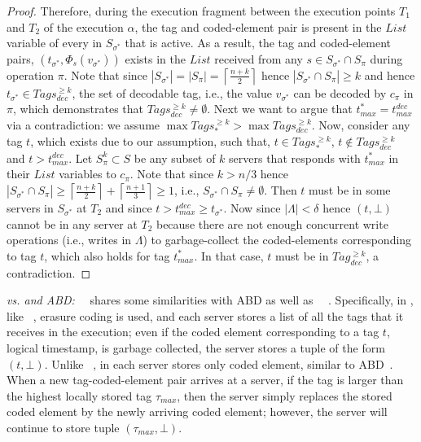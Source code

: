 \begin{proof}
				 Therefore, during the execution fragment between the execution points $T_1$ and $T_2$ of the execution $\alpha$, the tag and coded-element pair is present in the $List$ variable of every in $S_{\sigma^*}$ that is active. As a result, the tag and coded-element pairs, $(t_{\sigma^*}, \Phi_s(v_{\sigma^*}))$ exists in the $List$ received from any
				  $s \in S_{\sigma^*} \cap S_{\pi}$ during operation $\pi$. Note that since $|S_{\sigma^*}| = |S_{\pi}| =\left\lceil \frac{n+k}{2} \right \rceil $ hence
				 $| S_{\sigma^*} \cap S_{\pi} | \geq k$ and hence 
				 $t_{\sigma^*} \in Tags_{dec}^{\geq k} $, the set of decodable tag, i.e., the value $v_{\sigma^*}$ can be decoded
				  by $c_{\pi}$ in $\pi$, which demonstrates that $Tags_{dec}^{\geq k}  \neq \emptyset$. Next we want to 
				  argue that 
				  $t_{max}^* = t_{max}^{dec}$ via a contradiction: we assume 
				  $ \max Tags_{*}^{\geq k}  >  \max Tags_{dec}^{\geq k}  $. Now, consider any tag $t$, which  exists due to our assumption,  such that, 
				  $t \in Tags_{*}^{\geq k} $,  $t \not\in Tags_{dec}^{\geq k} $ and $t > t_{max}^{dec}$.
				 Let $S^k_{\pi} \subset S$ be any subset of $k$ servers that responds with $t^*_{max}$ in their $List$ variables to $c_{\pi}$. Note that since $k >  n/3$ hence $|S_{\sigma^*} \cap S_{\pi}|  \geq \left\lceil \frac{n+k}{2} \right \rceil +  \left\lceil \frac{n+1}{3} \right \rceil \geq 1$, i.e., $S_{\sigma^*} \cap S_{\pi} \neq \emptyset$. Then $t$ 
				 must be in some servers in $S_{\sigma^*}$ at $T_2$ and since $t > t_{max}^{dec} \geq t_{\sigma^*}$. 
				 Now since $|\Lambda| < \delta$ hence $(t, \bot)$ cannot be in any server at $T_2$  because there are not enough concurrent write operations (i.e., writes in $\Lambda$) to garbage-collect the coded-elements corresponding to tag $t$, which also holds  for tag  $t^{*}_{max}$. In that case, $t$ must be in $Tag_{dec}^{\geq k}$, a contradiction.
%
				\end{proof}
				
\noindent\textit{\treasmod{} vs. \treas{} and ABD:}~~\treasmod{}  shares some similarities with ABD \cite{ABD96} as well as ~\treas~\cite{NicolaouC0KML19}. Specifically, in \treasmod{}, like ~\treas{}, erasure coding is used, and each server stores a list of all the tags that it receives in the execution; even if the coded element corresponding to a tag $t$, logical timestamp, is garbage collected, the server stores a tuple of the form $(t, \bot)$. Unlike ~\treas{}, in \treasmod{} each server stores only coded element, similar to ABD~\cite{ABD96}. When a new tag-coded-element pair arrives  at a server, if the tag is larger than the highest locally stored tag $\tau_{max}$, then the server simply replaces the stored coded element by the newly arriving coded element; however, the server will continue to store tuple $(\tau_{max},\bot)$.

